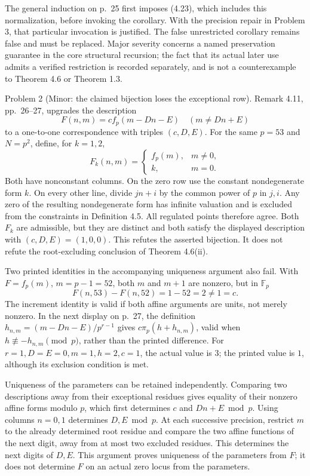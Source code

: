 \documentclass[10pt]{article}
\begin{document}
The general induction on p. 25 first imposes (4.23), which includes this normalization, before invoking the corollary. With the precision repair in Problem 3, that particular invocation is justified. The false unrestricted corollary remains false and must be replaced. Major severity concerns a named preservation guarantee in the core structural recursion; the fact that its actual later use admits a verified restriction is recorded separately, and is not a counterexample to Theorem 4.6 or Theorem 1.3.\par
Problem 2 (Minor: the claimed bijection loses the exceptional row).  Remark 4.11, pp. 26–27, upgrades the description \[F(n,m)=c f_p(m-Dn-E)\quad(m\ne Dn+E)\] to a one-to-one correspondence with triples \((c,D,E)\). For the same \(p=53\) and \(N=p^2\), define, for \(k=1,2\), \[F_k(n,m)=
 \begin{cases}f_p(m),&m\ne0,\\k,&m=0.\end{cases}\] Both have nonconstant columns. On the zero row use the constant nondegenerate form \(k\). On every other line, divide \(jn+i\) by the common power of \(p\) in \(j,i\). Any zero of the resulting nondegenerate form has infinite valuation and is excluded from the constraints in Definition 4.5. All regulated points therefore agree. Both \(F_k\) are admissible, but they are distinct and both satisfy the displayed description with \((c,D,E)=(1,0,0)\). This refutes the asserted bijection. It does not refute the root-excluding conclusion of Theorem 4.6(ii).\par
Two printed identities in the accompanying uniqueness argument also fail. With \(F=f_p(m)\), \(m=p-1=52\), both \(m\) and \(m+1\) are nonzero, but in \(\mathbb F_p\) \[F(n,53)-F(n,52)=1-52=2\ne1=c.\] The increment identity is valid if both affine arguments are units, not merely nonzero. In the next display on p. 27, the definition \(h_{n,m}=(m-Dn-E)/p^{r-1}\) gives \(c\pi_p(h+h_{n,m})\), valid when \(h\not\equiv-h_{n,m}\pmod p\), rather than the printed difference. For \(r=1,D=E=0,m=1,h=2,c=1\), the actual value is \(3\); the printed value is \(1\), although its exclusion condition is met.\par
Uniqueness of the parameters can be retained independently. Comparing two descriptions away from their exceptional residues gives equality of their nonzero affine forms modulo \(p\), which first determines \(c\) and \(Dn+E\bmod p\). Using columns \(n=0,1\) determines \(D,E\bmod p\). At each successive precision, restrict \(m\) to the already determined root residue and compare the two affine functions of the next digit, away from at most two excluded residues. This determines the next digits of \(D,E\). This argument proves uniqueness of the parameters from \(F\); it does not determine \(F\) on an actual zero locus from the parameters.\par
\end{document}
